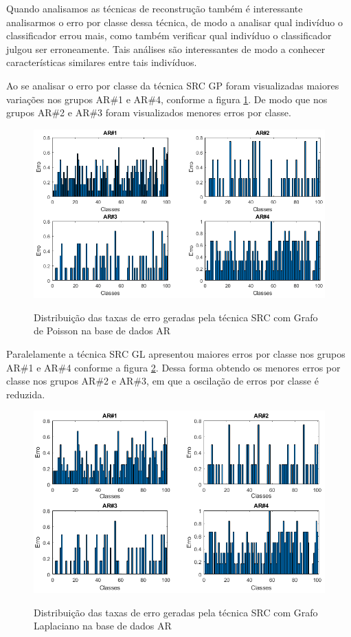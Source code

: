 Quando analisamos as técnicas de reconstrução também é interessante analisarmos o erro por classe dessa técnica, de modo a analisar qual indivíduo o classificador errou mais, como também verificar qual indivíduo o classificador julgou ser erroneamente. Tais análises são interessantes de modo a conhecer características similares entre tais indivíduos.


Ao se analisar o erro por classe da técnica SRC GP foram visualizadas maiores variações nos grupos AR\#1 e AR\#4, conforme a figura \ref{fig:taxa_erro_REC_SRC_Poisson}. De modo que nos grupos AR\#2 e AR\#3 foram visualizados menores erros por classe.


\begin{figure}[H]
\centering
\caption{Distribuição das taxas de erro geradas pela técnica SRC com Grafo de Poisson na base de dados AR}
\includegraphics[scale=0.5]{imgs4/erro_SRC_Poisson}
\label{fig:taxa_erro_REC_SRC_Poisson}
\end{figure}

Paralelamente a técnica SRC GL apresentou maiores erros por classe nos grupos AR\#1 e AR\#4 conforme a figura \ref{fig:taxa_erro_REC_SRC_Laplace}. Dessa forma obtendo os menores erros por classe nos grupos AR\#2 e AR\#3, em que a oscilação de erros por classe é reduzida.

\begin{figure}[H]
\centering
\caption{Distribuição das taxas de erro geradas pela técnica SRC com Grafo Laplaciano na base de dados AR}
\includegraphics[scale=0.5]{imgs4/erro_SRC_Laplace}
\label{fig:taxa_erro_REC_SRC_Laplace}
\end{figure}


